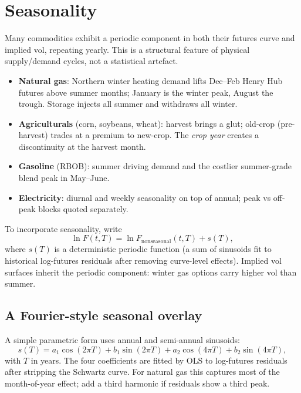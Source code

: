 \section{Seasonality}
\label{sec:seasonality}

Many commodities exhibit a periodic component in both their futures
curve and implied vol, repeating yearly.  This is a structural
feature of physical supply/demand cycles, not a statistical
artefact.

\begin{itemize}
  \item \textbf{Natural gas}: Northern winter heating demand lifts
    Dec--Feb Henry Hub futures above summer months; January is the
    winter peak, August the trough.  Storage injects all summer and
    withdraws all winter.
  \item \textbf{Agriculturals} (corn, soybeans, wheat): harvest
    brings a glut; old-crop (pre-harvest) trades at a premium to
    new-crop.  The \emph{crop year} creates a discontinuity at the
    harvest month.
  \item \textbf{Gasoline} (RBOB): summer driving demand and the
    costlier summer-grade blend peak in May--June.
  \item \textbf{Electricity}: diurnal and weekly seasonality on top
    of annual; peak vs off-peak blocks quoted separately.
\end{itemize}

To incorporate seasonality, write
\[
  \ln F(t,T) = \ln F_{\text{nonseasonal}}(t,T) + s(T),
\]
where $s(T)$ is a deterministic periodic function (a sum of
sinusoids fit to historical log-futures residuals after removing
curve-level effects).  Implied vol surfaces inherit the periodic
component: winter gas options carry higher vol than summer.

\subsection{A Fourier-style seasonal overlay}

A simple parametric form uses annual and semi-annual sinusoids:
\[
  s(T) = a_1 \cos(2\pi T) + b_1 \sin(2\pi T)
       + a_2 \cos(4\pi T) + b_2 \sin(4\pi T),
\]
with $T$ in years.  The four coefficients are fitted by OLS to
log-futures residuals after stripping the Schwartz curve.  For
natural gas this captures most of the month-of-year effect; add a
third harmonic if residuals show a third peak.

